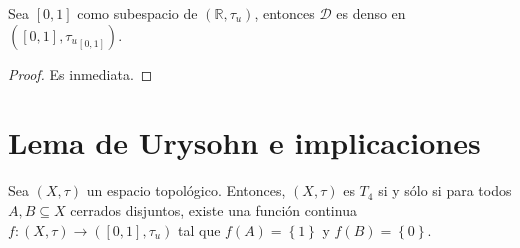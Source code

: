 \documentclass[12pt]{report}
\theoremstyle{largebreak}
\newcommand\cf[3]{\ensuremath{#1:#2\rightarrow#3}}
\begin{document}
    \begin{propo}
        Sea $[0,1]$ como subespacio de $(\mathbb{R},\tau_u)$, entonces $\mathcal{D}$ es denso en $([0,1],{\tau_u}_{[0,1]})$.
    \end{propo}

    \begin{proof}
        Es inmediata.
    \end{proof}

    \section{Lema de Urysohn e implicaciones}

    \begin{lema}
        Sea $(X,\tau)$ un espacio topológico. Entonces, $(X,\tau)$ es $T_4$ si y sólo si para todos $A,B\subseteq X$ cerrados disjuntos, existe una función continua $\cf{f}{(X,\tau)}{([0,1],\tau_u)}$ tal que $f(A)=\left\{1\right\}$ y $f(B)=\left\{0\right\}$.
    \end{lema}
\end{document}
